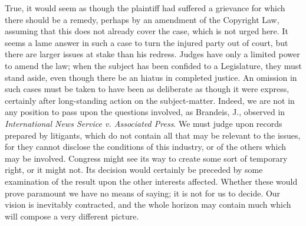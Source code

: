 True, it would seem as though the plaintiff had suffered a grievance for which
there should be a remedy, perhaps by an amendment of the Copyright Law,
assuming that this does not already cover the case, which is not urged here. 
It seems a lame answer in such a case to turn the injured party out of court,
but there are larger issues at stake than his redress.  Judges have only a
limited power to amend the law; when the subject has been confided to a
Legislature, they must stand aside, even though there be an hiatus in completed
justice.  An omission in such cases must be taken to have been as deliberate as
though it were express, certainly after long-standing action on the
subject-matter. Indeed, we are not in any position to pass upon the questions
involved, as Brandeis, J., observed in \textit{International News Service v.
Associated Press}.  We must judge upon records prepared by litigants, which do
not contain all that may be relevant to the issues, for they cannot disclose
the conditions of this industry, or of the others which may be involved. 
Congress might see its way to create some sort of temporary right, or it might
not.  Its decision would certainly be preceded by some examination of the
result upon the other interests affected.  Whether these would prove paramount
we have no means of saying; it is not for us to decide.  Our vision is
inevitably contracted, and the whole horizon may contain much which will
compose a very different picture.

